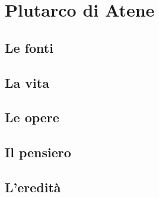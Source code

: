 \chapter{Plutarco di Atene}

\section{Le fonti}

\section{La vita}

\section{Le opere}

\section{Il pensiero}

\section{L'eredità}
